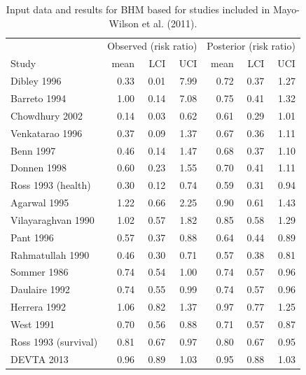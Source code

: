 \documentclass[12pt]{article}
\begin{document}
\begin{table}
\label{summary table}
\caption{Input data and results for BHM based for studies included in Mayo-Wilson et al. (2011).}
\begin{tabular}[t]{lrrrrrr}
\toprule
\multicolumn{1}{c}{} & \multicolumn{3}{c}{Observed (risk ratio)} & \multicolumn{3}{c}{Posterior (risk ratio)} \\
\cmidrule(l{3pt}r{3pt}){2-4} \cmidrule(l{3pt}r{3pt}){5-7}
Study & mean & LCI & UCI & mean & LCI & UCI\\
\midrule
Dibley 1996 & 0.33 & 0.01 & 7.99 & 0.72 & 0.37 & 1.27\\
Barreto 1994 & 1.00 & 0.14 & 7.08 & 0.75 & 0.41 & 1.32\\
Chowdhury 2002 & 0.14 & 0.03 & 0.62 & 0.61 & 0.29 & 1.01\\
Venkatarao 1996 & 0.37 & 0.09 & 1.37 & 0.67 & 0.36 & 1.11\\
Benn 1997 & 0.46 & 0.14 & 1.47 & 0.68 & 0.37 & 1.10\\
Donnen 1998 & 0.60 & 0.23 & 1.55 & 0.70 & 0.41 & 1.11\\
Ross 1993 (health) & 0.30 & 0.12 & 0.74 & 0.59 & 0.31 & 0.94\\
Agarwal 1995 & 1.22 & 0.66 & 2.25 & 0.90 & 0.61 & 1.43\\
Vilayaraghvan 1990 & 1.02 & 0.57 & 1.82 & 0.85 & 0.58 & 1.29\\
Pant 1996 & 0.57 & 0.37 & 0.88 & 0.64 & 0.44 & 0.89\\
Rahmatullah 1990 & 0.46 & 0.30 & 0.71 & 0.57 & 0.38 & 0.81\\
Sommer 1986 & 0.74 & 0.54 & 1.00 & 0.74 & 0.57 & 0.96\\
Daulaire 1992 & 0.74 & 0.55 & 0.99 & 0.74 & 0.57 & 0.96\\
Herrera 1992 & 1.06 & 0.82 & 1.37 & 0.97 & 0.77 & 1.25\\
West 1991 & 0.70 & 0.56 & 0.88 & 0.71 & 0.57 & 0.87\\
Ross 1993 (survival) & 0.81 & 0.67 & 0.97 & 0.80 & 0.67 & 0.95\\
DEVTA 2013 & 0.96 & 0.89 & 1.03 & 0.95 & 0.88 & 1.03\\
\bottomrule
\end{tabular}
\end{table}
\end{document}
